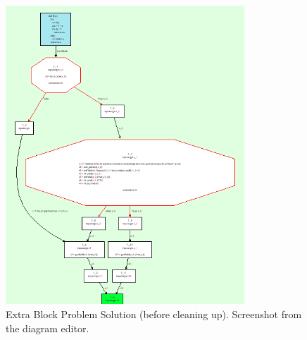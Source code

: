 \begin{figure}[h]
\centering
\includegraphics[width=0.8\textwidth]{needs-extra-block-med.png}
\caption{Extra Block Problem Solution (before cleaning up).
Screenshot from the diagram editor.}
\label{figure-8c}
\end{figure}


